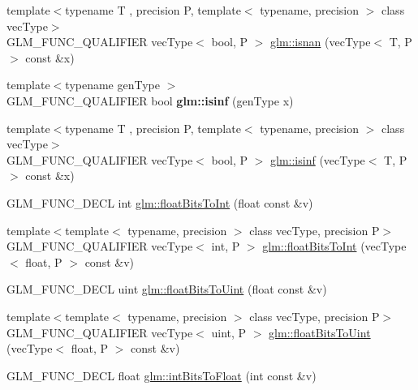 \begin{DoxyCompactItemize}
\item 
{\footnotesize template$<$typename T , precision P, template$<$ typename, precision $>$ class vec\+Type$>$ }\\G\+L\+M\+\_\+\+F\+U\+N\+C\+\_\+\+Q\+U\+A\+L\+I\+F\+I\+ER vec\+Type$<$ bool, P $>$ \hyperlink{group__core__func__common_ga6cb8f202a52eed2331724a3800198ebf}{glm\+::isnan} (vec\+Type$<$ T, P $>$ const \&x)
\item 
\mbox{\label{func__common_8inl_a2c0ee7d7e149b7ddf60abb7b73845330}} 
{\footnotesize template$<$typename gen\+Type $>$ }\\G\+L\+M\+\_\+\+F\+U\+N\+C\+\_\+\+Q\+U\+A\+L\+I\+F\+I\+ER bool {\bfseries glm\+::isinf} (gen\+Type x)
\item 
{\footnotesize template$<$typename T , precision P, template$<$ typename, precision $>$ class vec\+Type$>$ }\\G\+L\+M\+\_\+\+F\+U\+N\+C\+\_\+\+Q\+U\+A\+L\+I\+F\+I\+ER vec\+Type$<$ bool, P $>$ \hyperlink{group__core__func__common_gaf28f7a4696746f081685c9fd05c7e2de}{glm\+::isinf} (vec\+Type$<$ T, P $>$ const \&x)
\item 
G\+L\+M\+\_\+\+F\+U\+N\+C\+\_\+\+D\+E\+CL int \hyperlink{group__core__func__common_gadc6a536a7bef046c3293d2ccad6d9ca2}{glm\+::float\+Bits\+To\+Int} (float const \&v)
\item 
{\footnotesize template$<$template$<$ typename, precision $>$ class vec\+Type, precision P$>$ }\\G\+L\+M\+\_\+\+F\+U\+N\+C\+\_\+\+Q\+U\+A\+L\+I\+F\+I\+ER vec\+Type$<$ int, P $>$ \hyperlink{group__core__func__common_gac4a0710238ae54c67931dd29a0b0f873}{glm\+::float\+Bits\+To\+Int} (vec\+Type$<$ float, P $>$ const \&v)
\item 
G\+L\+M\+\_\+\+F\+U\+N\+C\+\_\+\+D\+E\+CL uint \hyperlink{group__core__func__common_ga748b4d2819b48d28ca09dc8733488873}{glm\+::float\+Bits\+To\+Uint} (float const \&v)
\item 
{\footnotesize template$<$template$<$ typename, precision $>$ class vec\+Type, precision P$>$ }\\G\+L\+M\+\_\+\+F\+U\+N\+C\+\_\+\+Q\+U\+A\+L\+I\+F\+I\+ER vec\+Type$<$ uint, P $>$ \hyperlink{group__core__func__common_ga1804d4c443605d8a27be644aa461afe4}{glm\+::float\+Bits\+To\+Uint} (vec\+Type$<$ float, P $>$ const \&v)
\item 
G\+L\+M\+\_\+\+F\+U\+N\+C\+\_\+\+D\+E\+CL float \hyperlink{group__core__func__common_ga2650dc57b2148a6ffbce20944fb4d97a}{glm\+::int\+Bits\+To\+Float} (int const \&v)

\end{DoxyCompactItemize}
